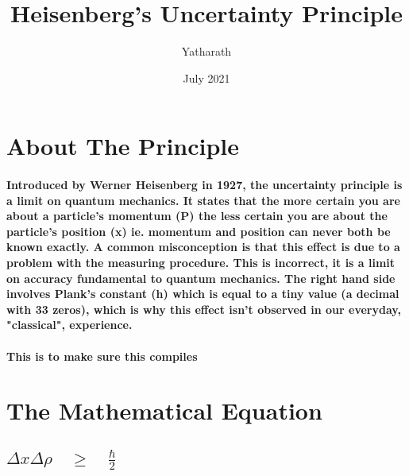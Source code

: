 \documentclass{article}
\title{Heisenberg's Uncertainty Principle}
\author{Yatharath}
\date{July 2021}
\begin{document}
\maketitle

\section*{About The Principle}
\paragraph{Introduced by Werner Heisenberg in 1927, the uncertainty principle is a limit on quantum mechanics. It states that the more certain you are about a particle's momentum (P) the less certain you are about the particle's position (x) ie. momentum and position can never both be known exactly. A common misconception is that this effect is due to a problem with the measuring procedure. This is incorrect, it is a limit on accuracy fundamental to quantum mechanics. The right hand side involves Plank's constant (h) which is equal to a tiny value (a decimal with 33 zeros), which is why this effect isn't observed in our everyday, "classical", experience.}
\paragraph{This is to make sure this compiles}
\section*{The Mathematical Equation}
\begin{center}
\section*{${ \Delta }{ x }{ \Delta }{\rho }\quad\ge\quad\frac{ \hbar }{ 2 }$}
\end{center}
\end{document}

